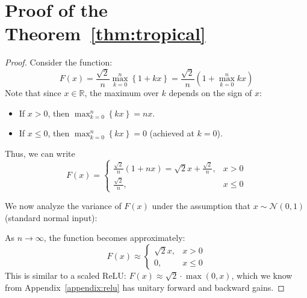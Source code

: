 \documentclass{article} %
\theoremstyle{plain}
\theoremstyle{definition}
\theoremstyle{remark}
\begin{document}
\section{Proof of the Theorem~\ref{thm:tropical}}
\label{appendix:tropical}
\begin{proof}
Consider the function:
\begin{equation}
F(x) = \frac{\sqrt{2}}{n} \max_{k=0}^{n} \left\{1 + kx \right\} = \frac{\sqrt{2}}{n} \left(1 + \max_{k=0}^{n} kx\right)
\end{equation}
Note that since $x \in \mathbb{R}$, the maximum over $k$ depends on the sign of $x$:
\begin{itemize}
    \item If $x > 0$, then $\max_{k=0}^{n} \left\{kx \right\} = nx$.
    \item If $x \leq 0$, then $\max_{k=0}^{n} \left\{kx \right\} = 0$ (achieved at $k=0$).
\end{itemize}
Thus, we can write
\begin{equation}
F(x) = 
\begin{cases}
\frac{\sqrt{2}}{n}(1 + nx) = \sqrt{2}x + \frac{\sqrt{2}}{n}, & x > 0 \\
\frac{\sqrt{2}}{n}, & x \le 0
\end{cases}
\end{equation}

We now analyze the variance of $F(x)$ under the assumption that $x \sim \mathcal{N}(0, 1)$ (standard normal input):

As $n \to \infty$, the function becomes approximately:
\begin{equation}
F(x) \approx 
\begin{cases}
\sqrt{2}x, & x > 0 \\
0, & x \le 0
\end{cases}
\end{equation}
This is similar to a scaled ReLU: $F(x) \approx \sqrt{2} \cdot \max(0, x)$, which we know from Appendix~\ref{appendix:relu} has unitary forward and backward gains.

\end{proof}
\end{document}
